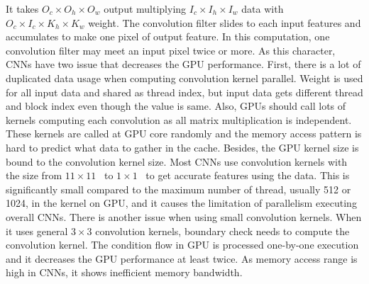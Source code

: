 It takes $O_{c}\times O_{h}\times O_{w}$ output multiplying $I_{c}\times I_{h}\times I_{w}$ 
data with $O_{c}\times I_{c}\times K_{h}\times K_{w}$ weight.
The convolution filter slides to each input features and accumulates to make one pixel of output feature.
In this computation, one convolution filter may meet an input pixel twice or more.
As this character, CNNs have two issue that decreases the GPU performance.
First, there is a lot of duplicated data usage when computing convolution kernel parallel.
Weight is used for all input data and shared as thread index, but input data gets different thread and block index even though the value is same.
Also, GPUs should call lots of kernels computing each convolution as all matrix multiplication is independent.
These kernels are called at GPU core randomly and the memory access pattern is hard to predict what data to gather in the cache.
Besides, the GPU kernel size is bound to the convolution kernel size.
Most CNNs use convolution kernels with the size from $11\times 11$~ to $1\times 1$~ to get accurate features using the data.
This is significantly small compared to the maximum number of thread, usually 512 or 1024, in the kernel on GPU, and it causes the limitation of parallelism executing overall CNNs.
There is another issue when using small convolution kernels.
When it uses general $3\times 3$ convolution kernels, boundary check needs to compute the convolution kernel.
The condition flow in GPU is processed one-by-one execution and it decreases the GPU performance at least twice.
As memory access range is high in CNNs, it shows inefficient memory bandwidth.

